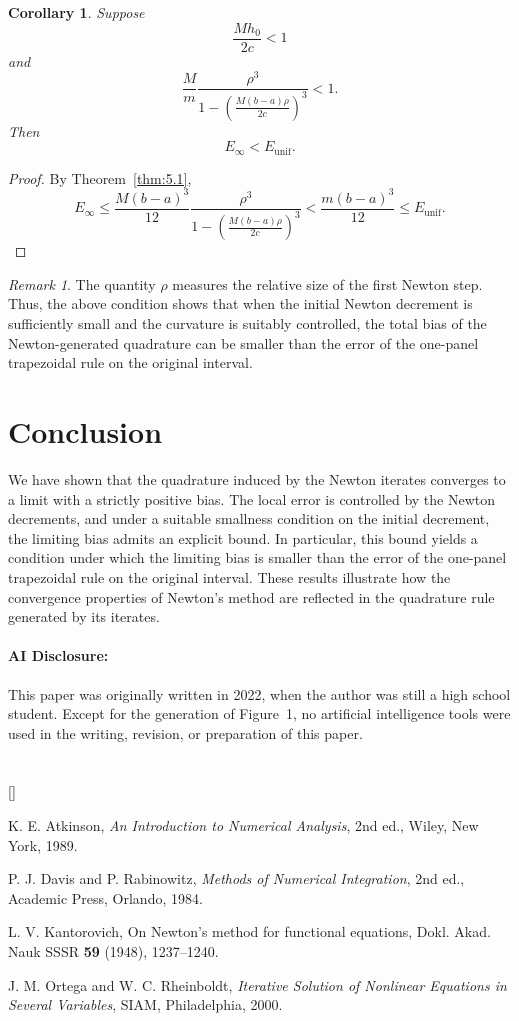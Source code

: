 \documentclass[psamsfonts,reqno]{amsart}
\makeatletter
\theoremstyle{plain}
\newtheorem{corollary}[theorem]{Corollary}
\theoremstyle{definition}
\theoremstyle{remark}
\newtheorem{remark}[theorem]{Remark}
\numberwithin{equation}{section}
\renewcommand{\@biblabel}[1]{%
  \textcolor{black}{[}\textcolor{darkgreen}{#1}\textcolor{black}{]}}
\renewenvironment{thebibliography}[1]
  {\section*{\refname}%
   \begin{list}{\@biblabel{\arabic{enumiv}}}{%
      \usecounter{enumiv}%
      \setlength{\labelwidth}{4em}%
      \setlength{\labelsep}{1em}%
      \setlength{\leftmargin}{\labelwidth}%
      \setlength{\rightmargin}{0pt}%
      \setlength{\itemsep}{1em}%
      \setlength{\parsep}{0pt}}}
  {\end{list}}
\makeatother
\begin{document}
\begin{corollary}
Suppose
\[
\frac{Mh_0}{2c}<1
\]
and
\[
\frac{M}{m}
\frac{\rho^3}
{1-\left(\frac{M(b-a)\rho}{2c}\right)^3}
<1.
\]
Then
\[
E_\infty<E_{\mathrm{unif}}.
\]
\end{corollary}

\begin{proof}
By Theorem~\ref{thm:5.1},
\[
E_\infty
\leq
\frac{M(b-a)^3}{12}
\frac{\rho^3}
{1-\left(\frac{M(b-a)\rho}{2c}\right)^3}
<
\frac{m(b-a)^3}{12}
\leq E_{\mathrm{unif}}.
\]\end{proof}

\begin{remark}
The quantity $\rho$ measures the relative size of the first Newton step. Thus, the above condition shows that when the initial Newton decrement is sufficiently small and the curvature is suitably controlled, the total bias of the Newton-generated quadrature can be smaller than the error of the one-panel trapezoidal rule on the original interval.
\end{remark}

\section{Conclusion}

We have shown that the quadrature induced by the Newton iterates converges
to a limit with a strictly positive bias. The local error is controlled by
the Newton decrements, and under a suitable smallness condition on the
initial decrement, the limiting bias admits an explicit bound. In
particular, this bound yields a condition under which the limiting bias is
smaller than the error of the one-panel trapezoidal rule on the original
interval. These results illustrate how the convergence properties of
Newton's method are reflected in the quadrature rule generated by its
iterates.
\vspace{0.25cm}
\paragraph{\textbf{AI Disclosure:}}
This paper was originally written in 2022, when the author
was still a high school student. Except for the generation of Figure~1, no
artificial intelligence tools were used in the writing, revision, or preparation of this paper.

\begin{thebibliography}{9}

K. E. Atkinson,
\emph{An Introduction to Numerical Analysis},
2nd ed., Wiley, New York, 1989.

P. J. Davis and P. Rabinowitz,
\emph{Methods of Numerical Integration},
2nd ed., Academic Press, Orlando, 1984.

L. V. Kantorovich,
On Newton's method for functional equations,
Dokl. Akad. Nauk SSSR \textbf{59} (1948), 1237--1240.

J. M. Ortega and W. C. Rheinboldt,
\emph{Iterative Solution of Nonlinear Equations in Several Variables},
SIAM, Philadelphia, 2000.


\end{thebibliography}
\end{document}
